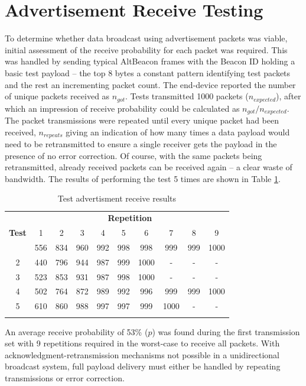 \documentclass[conference]{IEEEtran} %
\begin{document}
\section{Advertisement Receive Testing}
To determine whether data broadcast using advertisement packets was viable, initial assessment of the receive probability for each packet was required. This was handled by sending typical AltBeacon frames with the Beacon ID holding a basic test payload -- the top 8 bytes a constant pattern identifying test packets and the rest an incrementing packet count. The end-device reported the number of unique packets received as $n_{got}$. Tests transmitted 1000 packets ($n_{expected}$), after which an impression of receive probability could be calculated as $n_{got} / n_{expected}$. The packet transmissions were repeated until every unique packet had been received, $n_{repeats}$ giving  an indication of how many times a data payload would need to be retransmitted to ensure a single receiver gets the payload in the presence of no error correction. Of course, with the same packets being retransmitted, already received packets can be received again -- a clear waste of bandwidth. The results of performing the test 5 times are shown in Table \ref{tab:receive_prob}.
\begin{table}[H]
\caption{Test advertisment receive results}
\begin{center}
\begin{tabular}{c|ccccccccc}
\toprule
   & \multicolumn{9}{c}{\textbf{Repetition}} \\
\textbf{Test} & 1 & 2 & 3 & 4 & 5 & 6 & 7 & 8 & 9 \\
\midrule\addlinespace
1 & 556 & 834 & 960 & 992 & 998 & 998 & 999 & 999 & 1000 \\
2 & 440 & 796 & 944 & 987 & 999 & 1000 & - & - & -  \\
3 & 523 & 853 & 931 & 987 & 998 & 1000 & - & - & - \\
4 & 502 & 764 & 872 & 989 & 992 & 996 & 999 & 999 & 1000 \\
5 & 610 & 860 & 988 & 997 & 997 & 999 & 1000 & - & -  \\
\addlinespace\bottomrule
\end{tabular}
\end{center}
\label{tab:receive_prob}
\end{table}
 An average receive probability of 53\% ($p$) was found during the first transmission set with 9 repetitions required in the worst-case to receive all packets. With acknowledgment-retransmission mechanisms not possible in a unidirectional broadcast system, full payload delivery must either be handled by repeating transmissions or error correction.
\end{document}
